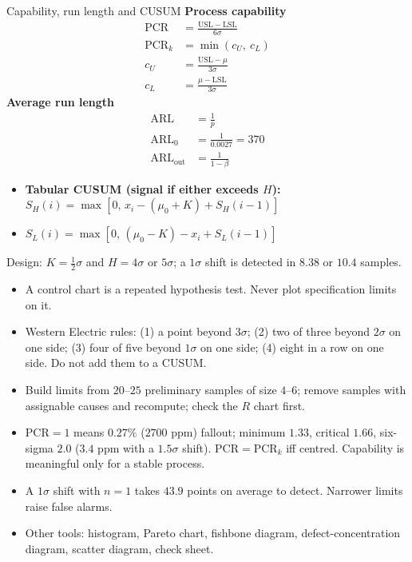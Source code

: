 \begin{formulabox}{Capability, run length and CUSUM}
\textbf{Process capability}
\[ \begin{aligned}\mathrm{PCR}&=\frac{\mathrm{USL}-\mathrm{LSL}}{6\sigma}\\[4pt] \mathrm{PCR}_k&=\min(c_U,\ c_L)\\ c_U&=\frac{\mathrm{USL}-\mu}{3\sigma}\\ c_L&=\frac{\mu-\mathrm{LSL}}{3\sigma}\end{aligned} \]
\textbf{Average run length}
\[ \begin{aligned}\mathrm{ARL}&=\frac1p\\ \mathrm{ARL}_0&=\frac1{0.0027}=370\\ \mathrm{ARL}_{\text{out}}&=\frac1{1-\beta}\end{aligned} \]
\begin{itemize}
  \item \textbf{Tabular CUSUM (signal if either exceeds $H$):} $S_H(i)=\max[0,\,x_i-(\mu_0+K)+S_H(i-1)]$
  \item $S_L(i)=\max[0,\,(\mu_0-K)-x_i+S_L(i-1)]$
\end{itemize}
Design: $K=\tfrac12\sigma$ and $H=4\sigma$ or $5\sigma$; a $1\sigma$ shift is detected in $8.38$ or $10.4$ samples.
\end{formulabox}

\begin{notebox}
\begin{itemize}
  \item A control chart is a repeated hypothesis test. Never plot specification limits on it.
  \item Western Electric rules: (1) a point beyond $3\sigma$; (2) two of three beyond $2\sigma$ on one side; (3) four of five beyond $1\sigma$ on one side; (4) eight in a row on one side. Do not add them to a CUSUM.
  \item Build limits from $20$--$25$ preliminary samples of size $4$--$6$; remove samples with assignable causes and recompute; check the $R$ chart first.
  \item $\mathrm{PCR}=1$ means $0.27\%$ ($2700$ ppm) fallout; minimum $1.33$, critical $1.66$, six-sigma $2.0$ ($3.4$ ppm with a $1.5\sigma$ shift). $\mathrm{PCR}=\mathrm{PCR}_k$ iff centred. Capability is meaningful only for a stable process.
  \item A $1\sigma$ shift with $n=1$ takes $43.9$ points on average to detect. Narrower limits raise false alarms.
  \item Other tools: histogram, Pareto chart, fishbone diagram, defect-concentration diagram, scatter diagram, check sheet.
\end{itemize}
\end{notebox}

